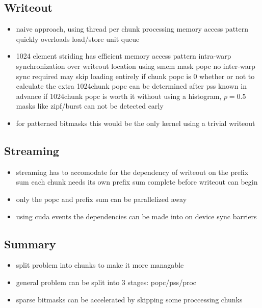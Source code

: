 \documentclass{tudscrreprt}
\begin{document}
		\subsection{Writeout}
			\begin{itemize}
				\item naive approach, using thread per chunk processing
					\subitem memory access pattern quickly overloads load/store unit queue
				\item 1024 element striding has efficient memory access pattern
					\subitem intra-warp synchronization over writeout location using smem mask popc
					\subitem no inter-warp sync required
					\subitem may skip loading entirely if chunk popc is 0
					\subitem whether or not to calculate the extra 1024chunk popc can be determined after pss
						\subsubitem known in advance if 1024chunk popc is worth it
						\subsubitem without using a histogram, $p=0.5$ masks like zipf/burst can not be detected early
				\item for patterned bitmasks this would be the only kernel using a trivial writeout
			\end{itemize}
		
		\subsection{Streaming}
			\begin{itemize}
				\item streaming has to accomodate for the dependency of writeout on the prefix sum
					\subitem each chunk needs its own prefix sum complete before writeout can begin
				\item only the popc and prefix sum can be parallelized away
				\item using cuda events the dependencies can be made into on device sync barriers
			\end{itemize}
		
		\subsection{Summary}
		
			\begin{itemize}
				\item split problem into chunks to make it more managable
				\item general problem can be split into 3 stages: popc/pss/proc
				\item sparse bitmasks can be accelerated by skipping some proccessing chunks
			\end{itemize}
		
\end{document}
